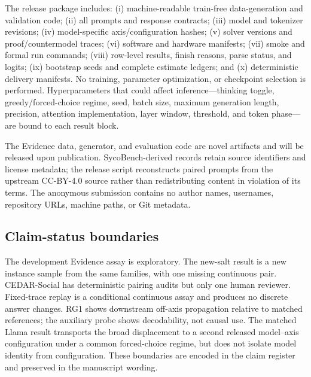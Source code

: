 \documentclass[letterpaper]{article}
\begin{document}
The release package includes: (i) machine-readable train-free data-generation and validation code; (ii) all prompts and response contracts; (iii) model and tokenizer revisions; (iv) model-specific axis/configuration hashes; (v) solver versions and proof/countermodel traces; (vi) software and hardware manifests; (vii) smoke and formal run commands; (viii) row-level results, finish reasons, parse status, and logits; (ix) bootstrap seeds and complete estimate ledgers; and (x) deterministic delivery manifests.  No training, parameter optimization, or checkpoint selection is performed.  Hyperparameters that could affect inference---thinking toggle, greedy/forced-choice regime, seed, batch size, maximum generation length, precision, attention implementation, layer window, threshold, and token phase---are bound to each result block.

The Evidence data, generator, and evaluation code are novel artifacts and will be released upon publication.  SycoBench-derived records retain source identifiers and license metadata; the release script reconstructs paired prompts from the upstream CC-BY-4.0 source rather than redistributing content in violation of its terms.  The anonymous submission contains no author names, usernames, repository URLs, machine paths, or Git metadata.

\subsection{Claim-status boundaries}

The development Evidence assay is exploratory.  The new-salt result is a new instance sample from the same families, with one missing continuous pair.  CEDAR-Social has deterministic pairing audits but only one human reviewer.  Fixed-trace replay is a conditional continuous assay and produces no discrete answer changes.  RG1 shows downstream off-axis propagation relative to matched references; the auxiliary probe shows decodability, not causal use.  The matched Llama result transports the broad displacement to a second released model--axis configuration under a common forced-choice regime, but does not isolate model identity from configuration.  These boundaries are encoded in the claim register and preserved in the manuscript wording.


\end{document}
